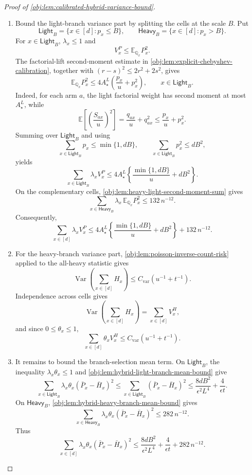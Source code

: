 \documentclass[11pt]{article}
\begin{document}
\begin{proof}[Proof of \cref{obj:lem:calibrated-hybrid-variance-bound}]
\begin{enumerate}
\item Bound the light-branch variance part by splitting the cells at the scale \(B\). Put
\[
\mathsf{Light}_B=\{x\in[d]:p_x\le B\},\qquad
\mathsf{Heavy}_B=\{x\in[d]:p_x>B\}.
\]
For \(x\in\mathsf{Light}_B\), \(\lambda_x\le1\) and
\[
V^P_x\le \mathbb E_{\mathbb Q_x}P_x^2.
\]
The factorial-lift second-moment estimate in \cref{obj:lem:explicit-chebyshev-calibration}, together with
\((r-s)^2\le2r^2+2s^2\), gives
\[
\mathbb E_{\mathbb Q_x}P_x^2
\le
4A_\star^L\left(\frac{p_x}{u}+p_x^2\right),
\qquad x\in\mathsf{Light}_B .
\]
Indeed, for each arm \(a\), the light factorial weight has second moment at most \(A_\star^L\), while
\[
\mathbb E\left[\left(\frac{S_{ax}}u\right)^2\right]
=
\frac{q_{ax}}u+q_{ax}^2
\le
\frac{p_x}{u}+p_x^2 .
\]
Summing over \(\mathsf{Light}_B\) and using
\[
\sum_{x\in\mathsf{Light}_B}p_x\le \min\{1,dB\},
\qquad
\sum_{x\in\mathsf{Light}_B}p_x^2\le dB^2,
\]
yields
\[
\sum_{x\in\mathsf{Light}_B}\lambda_x V^P_x
\le
4A_\star^L
\left\{
\frac{\min\{1,dB\}}{u}+dB^2
\right\}.
\]
On the complementary cells, \cref{obj:lem:heavy-light-second-moment-sum} gives
\[
\sum_{x\in\mathsf{Heavy}_B}\lambda_x\,\mathbb E_{\mathbb Q_x}P_x^2
\le 132\,n^{-12}.
\]
Consequently,
\[
\sum_{x\in[d]}\lambda_x V^P_x
\le
4A_\star^L
\left\{
\frac{\min\{1,dB\}}{u}+dB^2
\right\}
+132\,n^{-12}.
\]

\item For the heavy-branch variance part, \cref{obj:lem:poisson-inverse-count-risk} applied to the all-heavy statistic gives
\[
\operatorname{Var}\!\left(\sum_{x\in[d]}H_x\right)
\le
C_{\mathrm{var}}\left(u^{-1}+t^{-1}\right).
\]
Independence across cells gives
\[
\operatorname{Var}\!\left(\sum_{x\in[d]}H_x\right)
=
\sum_{x\in[d]}V^H_x,
\]
and since \(0\le\theta_x\le1\),
\[
\sum_{x\in[d]}\theta_x V^H_x
\le
C_{\mathrm{var}}\left(u^{-1}+t^{-1}\right).
\]

\item It remains to bound the branch-selection mean term. On \(\mathsf{Light}_B\), the inequality \(\lambda_x\theta_x\le1\) and \cref{obj:lem:hybrid-light-branch-mean-bound} give
\[
\sum_{x\in\mathsf{Light}_B}
\lambda_x\theta_x(\bar P_x-\bar H_x)^2
\le
\sum_{x\in\mathsf{Light}_B}(\bar P_x-\bar H_x)^2
\le
\frac{8dB^2}{\epsilon^2L^4}
+
\frac{4}{\epsilon t}.
\]
On \(\mathsf{Heavy}_B\), \cref{obj:lem:hybrid-heavy-branch-mean-bound} gives
\[
\sum_{x\in\mathsf{Heavy}_B}
\lambda_x\theta_x(\bar P_x-\bar H_x)^2
\le
282\,n^{-12}.
\]
Thus
\[
\sum_{x\in[d]}
\lambda_x\theta_x(\bar P_x-\bar H_x)^2
\le
\frac{8dB^2}{\epsilon^2L^4}
+
\frac{4}{\epsilon t}
+
282\,n^{-12}.
\]


\end{enumerate}
\end{proof}
\end{document}
